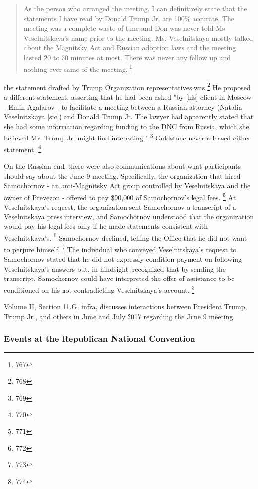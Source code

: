 \begin{quote}
As the person who arranged the meeting, I can definitively state that the statements I have read by Donald Trump Jr. are 100\% accurate.
The meeting was a complete waste of time and Don was never told Ms. Veselnitskaya's name prior to the meeting.
Ms. Veselnitskaya mostly talked about the Magnitsky Act and Russian adoption laws and the meeting lasted 20 to 30 minutes at most.
There was never any follow up and nothing ever came of the meeting.%
\footnote{767}
\end{quote}

the statement drafted by Trump Organization representatives was
\footnote{768}
He proposed a different statement, asserting that he had been asked "by [his] client in Moscow - Emin Agalarov - to facilitate a meeting between a Russian attorney (Natalia Veselnitzkaya [sic]) and Donald Trump Jr.
The lawyer had apparently stated that she had some information regarding funding to the DNC from Russia, which she believed Mr. Trump Jr. might find interesting."%
\footnote{769}
Goldstone never released either statement.%
\footnote{770}

On the Russian end, there were also communications about what participants should say about the June 9 meeting.
Specifically, the organization that hired Samochornov - an anti-Magnitsky Act group controlled by Veselnitskaya and the owner of Prevezon - offered to pay \$90,000 of Samochornov's legal fees.%
\footnote{771}
At Veselnitskaya's request, the organization sent Samochornov a transcript of a Veselnitskaya press interview, and Samochornov understood that the organization would pay his legal fees only if he made statements consistent with Veselnitskaya's.%
\footnote{772}
Samochornov declined, telling the Office that he did not want to perjure himself.%
\footnote{773}
The individual who conveyed Veselnitskaya's request to Samochornov stated that he did not expressly condition payment on following Veselnitskaya's answers but, in hindsight, recognized that by sending the transcript, Samochornov could have interpreted the offer of assistance to be conditioned on his not contradicting Veselnitskaya's account.%
\footnote{774}

Volume II, Section 11.G, infra, discusses interactions between President Trump, Trump Jr., and others in June and July 2017 regarding the June 9 meeting.

\subsubsection{Events at the Republican National Convention}

